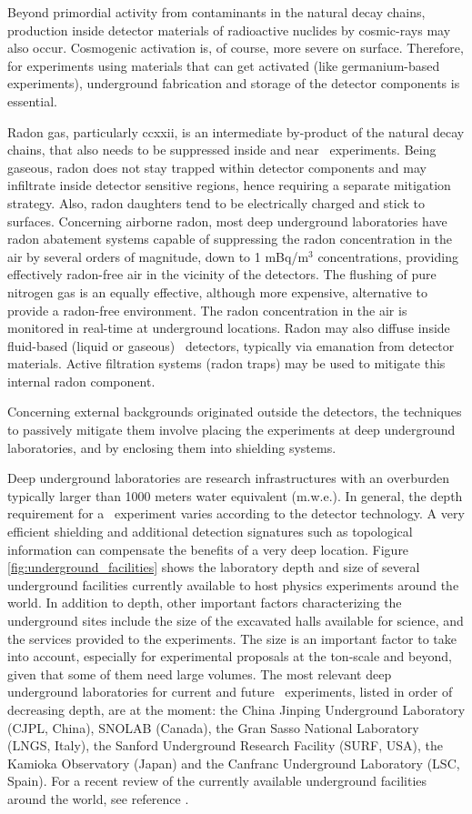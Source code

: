 Beyond primordial activity from contaminants in the natural decay chains, production inside detector materials of radioactive nuclides by cosmic-rays may also occur. Cosmogenic activation is, of course, more severe on surface. Therefore, for experiments using materials that can get activated (like germanium-based experiments), underground fabrication and storage of the detector components is essential.

Radon gas, particularly \Rn{222}, is an intermediate by-product of the natural decay chains, that also needs to be suppressed inside and near \bbonu\ experiments. Being gaseous, radon does not stay trapped within detector components and may infiltrate inside detector sensitive regions, hence requiring a separate mitigation strategy. Also, radon daughters tend to be electrically charged and stick to surfaces. Concerning airborne radon, most deep underground laboratories have radon abatement systems capable of suppressing the radon concentration in the air by several orders of magnitude, down to 1 mBq/m$^3$ concentrations, providing effectively radon-free air in the vicinity of the detectors. The flushing of pure nitrogen gas is an equally effective, although more expensive, alternative to provide a radon-free environment. The radon concentration in the air is monitored in real-time at underground locations. Radon may also diffuse inside fluid-based (liquid or gaseous) \bbonu\ detectors, typically via emanation from detector materials. Active filtration systems (radon traps) may be used to mitigate this internal radon component.

Concerning external backgrounds originated outside the detectors, the techniques to passively mitigate them involve placing the experiments at deep underground laboratories, and by enclosing them into shielding systems. 

Deep underground laboratories are research infrastructures with an overburden typically larger than 1000 meters water equivalent (m.w.e.). In general, the depth requirement for a \bbonu\ experiment varies according to the detector technology. A very efficient shielding and additional detection signatures such as topological information can compensate the benefits of a very deep location. Figure \ref{fig:underground_facilities} shows the laboratory depth and size of several underground facilities currently available to host physics experiments around the world. In addition to depth, other important factors characterizing the underground sites include the size of the excavated halls available for science, and the services provided to the experiments. The size is an important factor to take into account, especially for experimental proposals at the ton-scale and beyond, given that some of them need large volumes. The most relevant deep underground laboratories for current and future \bbonu\ experiments, listed in order of decreasing depth, are at the moment: the China Jinping Underground Laboratory (CJPL, China), SNOLAB (Canada), the Gran Sasso National Laboratory (LNGS, Italy), the Sanford Underground Research Facility (SURF, USA), the Kamioka Observatory (Japan) and the Canfranc Underground Laboratory (LSC, Spain). For a recent review of the currently available underground facilities around the world, see reference \cite{Ianni:2023fvs}. 

